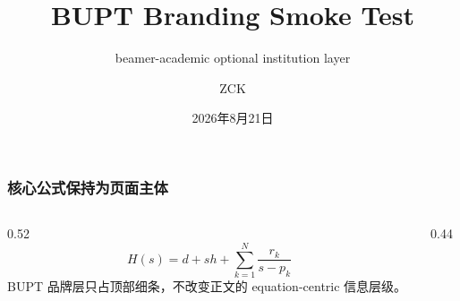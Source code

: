 \documentclass[aspectratio=169,10pt,t]{beamer}
\title{BUPT Branding Smoke Test}
\subtitle{beamer-academic optional institution layer}
\author{ZCK}
\institute{北京邮电大学 电子工程学院}
\date{2026年8月21日}
\begin{document}
\begin{frame}[plain]
  \titlepage
\end{frame}

\begin{frame}[t]
  \frametitle{核心公式保持为页面主体}
  \begin{columns}[T,onlytextwidth]
    \begin{column}{0.52\textwidth}
      \[
        H(s)=d+sh+\sum_{k=1}^{N}\frac{r_k}{s-p_k}
      \]
      \small
      BUPT 品牌层只占顶部细条，不改变正文的 equation-centric 信息层级。
    \end{column}
    \begin{column}{0.44\textwidth}
    \end{column}
  \end{columns}
\end{frame}
\end{document}
